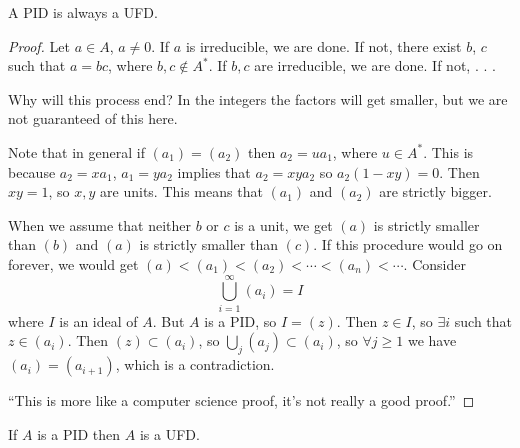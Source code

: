 \begin{theorem}
A PID is always a UFD.
\end{theorem}
\begin{proof}
Let $a \in A$, $a \neq 0$. If $a$ is irreducible, we are done. If not,
there exist $b$, $c$ such that $a = bc$, where $b, c \notin
A^\ast$. If $b, c$ are irreducible, we are done. If not, . . .

Why will this process end? In the integers the factors will get
smaller, but we are not guaranteed of this here.

Note that in general if $(a_1) = (a_2)$ then $a_2 = u a_1$, where
$u \in A^\ast$. This is because $a_2 = x a_1$, $a_1 = y a_2$ implies
that $a_2 = xya_2$ so $a_2(1 - xy) = 0$. Then $xy = 1$, so $x, y$ are
units. This means that $(a_1)$ and $(a_2)$ are strictly bigger.

When we assume that neither $b$ or $c$ is a unit, we get
$(a)$ is strictly smaller than $(b)$ and $(a)$ is strictly smaller
than $(c)$. If this procedure would go on forever, we would get
$(a) < (a_1) < (a_2) < \cdots < (a_n) < \cdots$. Consider
$$
\bigcup_{i=1}^\infty (a_i) = I
$$
where $I$ is an ideal of $A$. But $A$ is a PID, so $I = (z)$.
Then $z \in I$, so $\exists i$ such that $z \in (a_i)$.
Then $(z) \subset (a_i)$, so $\bigcup_j (a_j) \subset (a_i)$, so
$\forall j \geq 1$ we have $(a_i) = (a_{i+1})$, which is a
contradiction.

``This is more like a computer science proof, it's not really a good proof.''
\end{proof}

\begin{theorem}
If $A$ is a PID then $A$ is a UFD.
\end{theorem}


